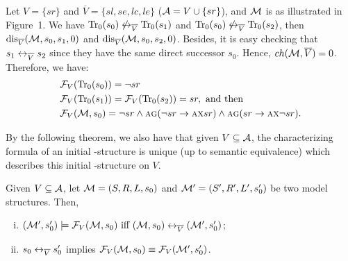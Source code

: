 \documentclass{article}
\begin{document}
\begin{example}
Let $V=\{sr\}$ and $\overline V=\{sl,se,lc,le\}$ (${\cal A} = V\cup \{sr\}$), and ${\cal M}$ is as illustrated in Figure~1.  We have $\textrm{Tr}_0(s_0) \not \leftrightarrow_{\overline V} \textrm{Tr}_0(s_1)$ and $\textrm{Tr}_0(s_0) \not \leftrightarrow_{\overline V} \textrm{Tr}_0(s_2)$, then $\textrm{dis}_{\overline V}({\cal M}, s_0, s_1, 0)$ and $\textrm{dis}_{\overline V}({\cal M}, s_0, s_2, 0)$.
Besides, it is easy checking that $s_1 \leftrightarrow_{\overline V} s_2$ since they have the same direct successor $s_0$.
Hence, $ch({\cal M}, \overline V) = 0$.
Therefore, we have:
\begin{align*}
& {\cal F}_V(\textrm{Tr}_0(s_0))= \neg sr \\
& {\cal F}_V(\textrm{Tr}_0(s_1)) = {\cal F}_V(\textrm{Tr}_0(s_2)) = sr, \text{ and then }\\
& {\cal F}_V ({\cal M}, s_0)= \neg sr \wedge \textsc{a}\textsc{g}(\neg sr \rightarrow  \textsc{a} \textsc{x} sr)\wedge \textsc{a}\textsc{g}(sr \rightarrow  \textsc{a} \textsc{x} \neg sr).
\end{align*}

\end{example}

By the following theorem, we also have that given  $V\subseteq {\cal A}$, the characterizing formula of an initial \MPK-structure is unique (up to semantic equivalence) which describes this initial \MPK-structure on $V$.
\begin{theorem}\label{CF}
Given $V\subseteq {\cal A}$, let ${\cal M}=(S,R,L,s_0)$  and ${\cal M}'=(S',R', L',s_0')$ be two model structures. Then,
\begin{enumerate}[(i)]
 \item $({\cal M}',s_0') \models {\cal F}_V({\cal M},s_0)
\text{ iff }
({\cal M},s_0) \leftrightarrow_{\overline V} ({\cal M}',s_0')$;

\item $s_0 \leftrightarrow_{\overline V} s_0'$ implies  ${\cal F}_V({\cal M}, s_0) \equiv {\cal F}_V({\cal M}', s_0')$.
\end{enumerate}

\end{theorem}
\end{document}
